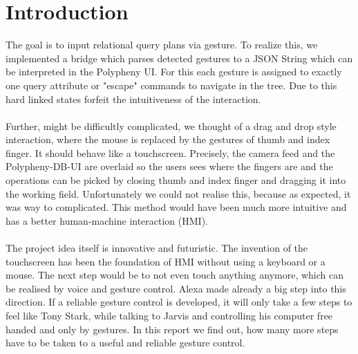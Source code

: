 \section{Introduction}
\label{g1:sec:introduction}  %

The goal is to input relational query plans via gesture. To realize this, we implemented a bridge which parses detected gestures to a JSON String which can be interpreted in the Polypheny UI. For this each gesture is assigned to exactly one query attribute or "escape" commands to navigate in the tree. Due to this hard linked states forfeit the intuitiveness of the interaction.
\\
\\
Further, might be difficultly complicated, we thought of a drag and drop style interaction, where the mouse is replaced by the gestures of thumb and index finger. It should behave like a touchscreen. Precisely, the camera feed and the Polypheny-DB-UI are overlaid so the users sees where the fingers are and the operations can be picked by closing thumb and index finger and dragging it into the working field. Unfortunately we could not realise this, because as expected, it was way to complicated. This method would have been much more intuitive and has a better human-machine interaction (HMI).
\\
\\
The project idea itself is innovative and futuristic. The invention of the touchscreen has been the foundation of HMI without using a keyboard or a mouse. The next step would be to not even touch anything anymore, which can be realised by voice and gesture control. Alexa made already a big step into this direction. If a reliable gesture control is developed, it will only take a few steps to feel like Tony Stark, while talking to Jarvis and controlling his computer free handed and only by gestures. In this report we find out, how many more steps have to be taken to a useful and reliable gesture control.

